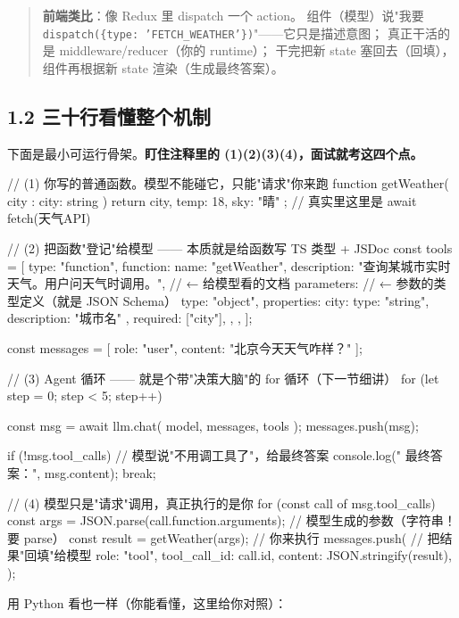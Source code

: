 \begin{quote}
 \textbf{前端类比}：像 Redux 里 dispatch 一个 action。
组件（模型）说"我要 \texttt{dispatch(\{type: 'FETCH\_WEATHER'\})}"——它只是描述意图；
真正干活的是 middleware/reducer（你的 runtime）；
干完把新 state 塞回去（回填），组件再根据新 state 渲染（生成最终答案）。
\end{quote}

\subsection{1.2 三十行看懂整个机制}

下面是最小可运行骨架。\textbf{盯住注释里的 (1)(2)(3)(4)，面试就考这四个点。}

\begin{codeblock}
// (1) 你写的普通函数。模型不能碰它，只能"请求"你来跑
function getWeather({ city }: { city: string }) {
  return { city, temp: 18, sky: "晴" };   // 真实里这里是 await fetch(天气API)
}

// (2) 把函数"登记"给模型 —— 本质就是给函数写 TS 类型 + JSDoc
const tools = [{
  type: "function",
  function: {
    name: "getWeather",
    description: "查询某城市实时天气。用户问天气时调用。",  // ← 给模型看的文档
    parameters: {                                          // ← 参数的类型定义（就是 JSON Schema）
      type: "object",
      properties: { city: { type: "string", description: "城市名" } },
      required: ["city"],
    },
  },
}];

const messages = [{ role: "user", content: "北京今天天气咋样？" }];

// (3) Agent 循环 —— 就是个带"决策大脑"的 for 循环（下一节细讲）
for (let step = 0; step < 5; step++) {
  const msg = await llm.chat({ model, messages, tools });
  messages.push(msg);

  if (!msg.tool_calls) {                    // 模型说"不用调工具了"，给最终答案
    console.log(" 最终答案：", msg.content);
    break;
  }

  // (4) 模型只是"请求"调用，真正执行的是你
  for (const call of msg.tool_calls) {
    const args = JSON.parse(call.function.arguments);   // 模型生成的参数（字符串！要 parse）
    const result = getWeather(args);                    // 你来执行
    messages.push({                                     // 把结果"回填"给模型
      role: "tool",
      tool_call_id: call.id,
      content: JSON.stringify(result),
    });
  }
}
\end{codeblock}

用 Python 看也一样（你能看懂，这里给你对照）：

